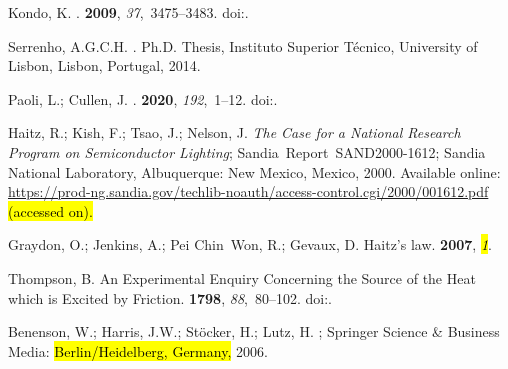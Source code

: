 \documentclass[energies,article,accept,moreauthors,pdftex]{Definitions/mdpi}\usepackage[]{graphicx}\usepackage[]{color}
\begin{document}
\begin{thebibliography}{999}
Kondo, K.
.
 {\bf 2009}, {\em 37},~3475--3483.
\newblock
  doi:{\href{https://doi.org/10.1016/j.enpol.2009.05.060}{}}.%

Serrenho, A.G.C.H.
.
\newblock Ph.D. Thesis, Instituto Superior T{\'{e}}cnico, University of Lisbon,
  Lisbon, Portugal,  2014.%

Paoli, L.; Cullen, J.
.
 {\bf 2020}, {\em 192},~1--12.%
\newblock
  doi:{\href{https://doi.org/10.1016/j.energy.2019.116228}{}}.

Haitz, R.; Kish, F.; Tsao, J.; Nelson, J.
\newblock \emph{The Case for a National Research Program on Semiconductor
  Lighting};
\newblock \mbox{Sandia Report SAND2000-1612}; Sandia National Laboratory, Albuquerque:
  New Mexico, Mexico,  2000.  Available online: 
  \url{https://prod-ng.sandia.gov/techlib-noauth/access-control.cgi/2000/001612.pdf}  \hl{(accessed on).} %


Graydon, O.; Jenkins, A.; Pei Chin~Won, R.; Gevaux, D.
\newblock Haitz's law.
 {\bf 2007}, {\em \hl{1}}.%

Thompson, B.
\newblock An Experimental Enquiry Concerning the Source of the Heat which is
  Excited by Friction.
 {\bf
  1798}, {\em 88},~80--102.
\newblock
  doi:{\href{https://doi.org/10.1098/rstl.1798.0006}{}}. %

Benenson, W.; Harris, J.W.; St{\"o}cker, H.; Lutz, H.
; Springer Science \& Business Media:  \hl{Berlin/Heidelberg, Germany,} %
  2006.%


\end{thebibliography}
\end{document}
